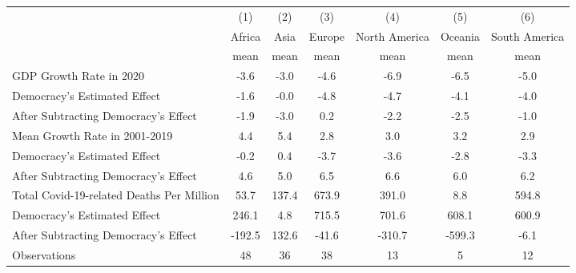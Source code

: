{
\def\sym#1{\ifmmode^{#1}\else\(^{#1}\)\fi}
\begin{tabular}{l*{6}{c}}
\hline\hline
                    &\multicolumn{1}{c}{(1)}&\multicolumn{1}{c}{(2)}&\multicolumn{1}{c}{(3)}&\multicolumn{1}{c}{(4)}&\multicolumn{1}{c}{(5)}&\multicolumn{1}{c}{(6)}\\
                    &      Africa&        Asia&      Europe&North America&     Oceania&South America\\
                    &        mean&        mean&        mean&        mean&        mean&        mean\\
\hline
GDP Growth Rate in 2020&        -3.6&        -3.0&        -4.6&        -6.9&        -6.5&        -5.0\\
Democracy's Estimated Effect&        -1.6&        -0.0&        -4.8&        -4.7&        -4.1&        -4.0\\
After Subtracting Democracy's Effect&        -1.9&        -3.0&         0.2&        -2.2&        -2.5&        -1.0\\
Mean Growth Rate in 2001-2019&         4.4&         5.4&         2.8&         3.0&         3.2&         2.9\\
Democracy's Estimated Effect&        -0.2&         0.4&        -3.7&        -3.6&        -2.8&        -3.3\\
After Subtracting Democracy's Effect&         4.6&         5.0&         6.5&         6.6&         6.0&         6.2\\
Total Covid-19-related Deaths Per Million&        53.7&       137.4&       673.9&       391.0&         8.8&       594.8\\
Democracy's Estimated Effect&       246.1&         4.8&       715.5&       701.6&       608.1&       600.9\\
After Subtracting Democracy's Effect&      -192.5&       132.6&       -41.6&      -310.7&      -599.3&        -6.1\\
\hline
Observations        &          48&          36&          38&          13&           5&          12\\
\hline\hline
\end{tabular}
}
